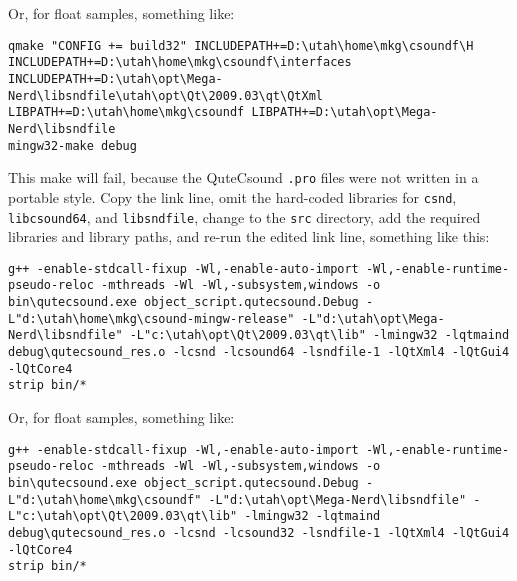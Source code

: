 \documentclass[11pt,letterpaper,onecolumn]{scrartcl}
\begin{document}
\begin{sloppypar}
\begin{enumerate}
\begin{enumerate}
			\noindent Or, for float samples, something like:
			
			\begin{lstlisting}
qmake "CONFIG += build32" INCLUDEPATH+=D:\utah\home\mkg\csoundf\H INCLUDEPATH+=D:\utah\home\mkg\csoundf\interfaces INCLUDEPATH+=D:\utah\opt\Mega-Nerd\libsndfile\utah\opt\Qt\2009.03\qt\QtXml LIBPATH+=D:\utah\home\mkg\csoundf LIBPATH+=D:\utah\opt\Mega-Nerd\libsndfile
mingw32-make debug
			\end{lstlisting}
			
			\noindent This make will fail, because the QuteCsound \texttt{.pro} files were not written in a portable style. Copy the link line, omit the hard-coded libraries for \texttt{csnd}, \texttt{libcsound64}, and \texttt{libsndfile}, change to the \texttt{src} directory, add the required libraries and library paths, and re-run the edited link line, something like this:
			
			\begin{lstlisting}
g++ -enable-stdcall-fixup -Wl,-enable-auto-import -Wl,-enable-runtime-pseudo-reloc -mthreads -Wl -Wl,-subsystem,windows -o bin\qutecsound.exe object_script.qutecsound.Debug -L"d:\utah\home\mkg\csound-mingw-release" -L"d:\utah\opt\Mega-Nerd\libsndfile" -L"c:\utah\opt\Qt\2009.03\qt\lib" -lmingw32 -lqtmaind debug\qutecsound_res.o -lcsnd -lcsound64 -lsndfile-1 -lQtXml4 -lQtGui4 -lQtCore4
strip bin/*	
			\end{lstlisting}
			
			\noindent Or, for float samples, something like:
			
			\begin{lstlisting}
g++ -enable-stdcall-fixup -Wl,-enable-auto-import -Wl,-enable-runtime-pseudo-reloc -mthreads -Wl -Wl,-subsystem,windows -o bin\qutecsound.exe object_script.qutecsound.Debug -L"d:\utah\home\mkg\csoundf" -L"d:\utah\opt\Mega-Nerd\libsndfile" -L"c:\utah\opt\Qt\2009.03\qt\lib" -lmingw32 -lqtmaind debug\qutecsound_res.o -lcsnd -lcsound32 -lsndfile-1 -lQtXml4 -lQtGui4 -lQtCore4
strip bin/*	
			\end{lstlisting}
			

\end{enumerate}
\end{enumerate}
\end{sloppypar}
\end{document}
